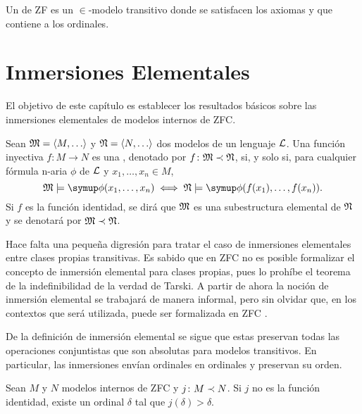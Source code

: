 \documentclass
[
  12pt,
  letterpaper,
  openany,
  oneside,
]{book}
\begin{document}
\begin{defi}
    Un  de ZF es un $\in$-modelo transitivo
    donde se satisfacen los axiomas y que contiene a los ordinales.
\end{defi}

\section{Inmersiones Elementales}
\label{sec:elem-embed}

El objetivo de este capítulo es establecer los resultados básicos
sobre las inmersiones elementales de modelos internos de ZFC.

\begin{defi}
    Sean $\model{M} = \op{M,\dots}$ y $\model{N} = \op{N,\dots}$ dos modelos de un lenguaje $\mathcal { L }$.
    Una función inyectiva $f\colon M\to N$ es una ,
    denotado por $f\colon \mathfrak { M }\prec\mathfrak { N }$, si, y solo si, para cualquier fórmula
    n-aria $\phi$ de $\mathcal { L }$ y $x_1,\dots,x_n \in M$,
    \[
        \model{M}\models\phi(x_1,\dots,x_n) \iff \model{N}\models\phi(f(x_1),\dots,f(x_n)).
    \]
    Si $f$ es la función identidad, se dirá que $\mathfrak { M }$
    es una subestructura elemental de $\mathfrak { N }$ y se denotará por $\mathfrak { M }\prec\mathfrak { N }$.
\end{defi}

Hace falta una pequeña digresión para tratar el caso de inmersiones elementales
entre clases propias transitivas. Es sabido que en ZFC no es posible formalizar
el concepto de inmersión elemental para clases propias, pues lo prohíbe el teorema
de la indefinibilidad de la verdad de Tarski.
A partir de ahora la noción de inmersión elemental se trabajará de manera informal,
pero sin olvidar que, en los contextos que será utilizada, puede ser formalizada
en ZFC \autocite[45-46]{kanamori_higher_2009}.

De la definición de inmersión elemental se sigue que estas preservan todas
las operaciones conjuntistas que son absolutas para modelos transitivos.
En particular, las inmersiones envían ordinales en ordinales y
preservan su orden.

\begin{teo}\label{teo:elem-embed-trivial}
    Sean $M$ y $N$ modelos internos de ZFC y $j\colon M\prec N$.
    Si $j$ no es la función identidad, existe un ordinal $\delta$
    tal que $j(\delta)>\delta$.
\end{teo}
\end{document}
